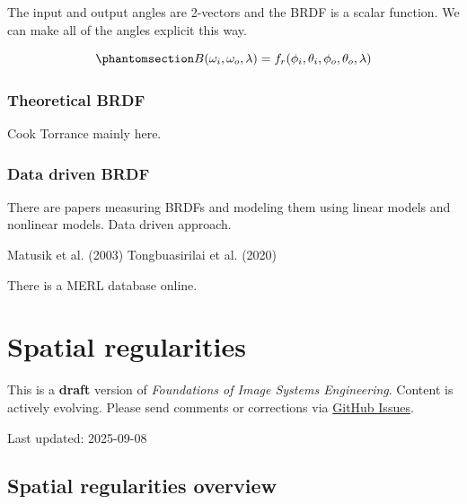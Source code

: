 \documentclass[
  letterpaper,
]{book}
\begin{document}
The input and output angles are 2-vectors and the BRDF is a scalar
function. We can make all of the angles explicit this way.

\begin{equation}\phantomsection\label{eq-BRDF2}{
B(\omega_i, \omega_o, \lambda) = f_r(\phi_i,\theta_i,\phi_o,\theta_o,\lambda)
}\end{equation}

\subsection{Theoretical BRDF}\label{theoretical-brdf}

Cook Torrance mainly here.

\subsection{Data driven BRDF}\label{data-driven-brdf}

There are papers measuring BRDFs and modeling them using linear models
and nonlinear models. Data driven approach.

Matusik et al. (2003) Tongbuasirilai et al. (2020)

There is a MERL database online.

\chapter{Spatial regularities}\label{sec-spatial-regularities}

\begin{tcolorbox}[enhanced jigsaw, opacityback=0, breakable, coltitle=black, leftrule=.75mm, left=2mm, colframe=quarto-callout-warning-color-frame, opacitybacktitle=0.6, bottomtitle=1mm, bottomrule=.15mm, toprule=.15mm, title=\textcolor{quarto-callout-warning-color}{\faExclamationTriangle}\hspace{0.5em}{Work in Progress}, titlerule=0mm, toptitle=1mm, colback=white, rightrule=.15mm, colbacktitle=quarto-callout-warning-color!10!white, arc=.35mm]

This is a \textbf{draft} version of \emph{Foundations of Image Systems
Engineering}. Content is actively evolving. Please send comments or
corrections via \href{https://github.com/wandell/FISE-git/issues}{GitHub
Issues}.

Last updated: 2025-09-08

\end{tcolorbox}

\section{Spatial regularities
overview}\label{sec-spatial-regularities-overview}
\end{document}
